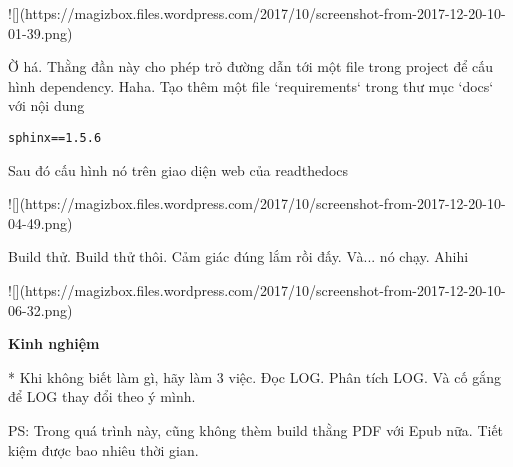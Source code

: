 ![](https://magizbox.files.wordpress.com/2017/10/screenshot-from-2017-12-20-10-01-39.png)

Ờ há. Thằng đần này cho phép trỏ đường dẫn tới một file trong project để cấu hình dependency. Haha.
Tạo thêm một file `requirements` trong thư mục `docs` với nội dung

\begin{lstlisting}
sphinx==1.5.6
\end{lstlisting}


Sau đó cấu hình nó trên giao diện web của readthedocs

![](https://magizbox.files.wordpress.com/2017/10/screenshot-from-2017-12-20-10-04-49.png)

Build thử. Build thử thôi. Cảm giác đúng lắm rồi đấy. Và... nó chạy. Ahihi

![](https://magizbox.files.wordpress.com/2017/10/screenshot-from-2017-12-20-10-06-32.png)

\textbf{Kinh nghiệm}

* Khi không biết làm gì, hãy làm 3 việc. Đọc LOG. Phân tích LOG. Và cố gắng để LOG thay đổi theo ý mình.

PS: Trong quá trình này, cũng không thèm build thằng PDF với Epub nữa. Tiết kiệm được bao nhiêu thời gian.
